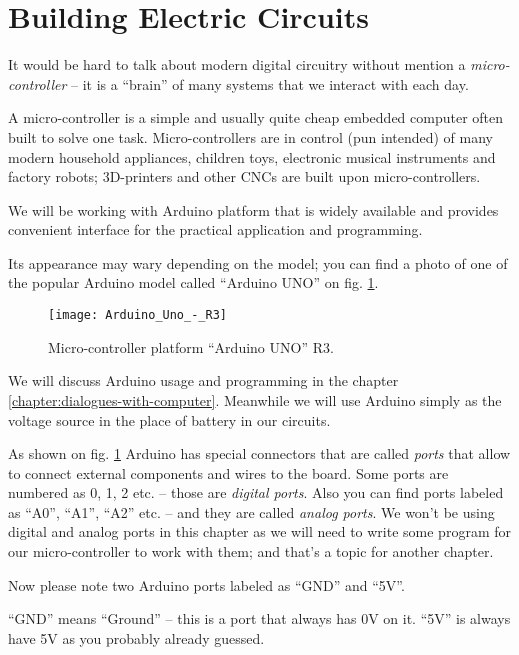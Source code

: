 \documentclass[../sparc.tex]{subfiles}
\begin{document}
\section{Building Electric Circuits}

It would be hard to talk about modern digital circuitry without mention a
\emph{micro-controller} -- it is a ``brain'' of many systems that we interact
with each day.

A micro-controller is a simple and usually quite cheap embedded computer often
built to solve one task.  Micro-controllers are in control (pun intended) of
many modern household appliances, children toys, electronic musical instruments
and factory robots; 3D-printers and other CNCs are built upon micro-controllers.

We will be working with Arduino platform that is widely available and provides
convenient interface for the practical application and programming.

Its appearance may wary depending on the model; you can find a photo of one of
the popular Arduino model called ``Arduino UNO'' on
fig. \ref{fig:arduino-uno-r3}.

\begin{figure}[ht]
  \centering
  \texttt{[image: Arduino\_Uno\_-\_R3]}
  \caption{Micro-controller platform ``Arduino UNO'' R3.}
  \label{fig:arduino-uno-r3}
\end{figure}

We will discuss Arduino usage and programming in the chapter
\ref{chapter:dialogues-with-computer}.  Meanwhile we will use Arduino simply as
the voltage source in the place of battery in our circuits.

As shown on fig. \ref{fig:arduino-uno-r3} Arduino has special connectors that
are called \emph{ports} that allow to connect external components and wires to
the board.  Some ports are numbered as 0, 1, 2 etc. -- those are \emph{digital
ports}.  Also you can find ports labeled as ``A0'', ``A1'', ``A2'' etc. -- and
they are called \emph{analog ports}.  We won't be using digital and analog ports
in this chapter as we will need to write some program for our micro-controller
to work with them; and that's a topic for another chapter.

Now please note two Arduino ports labeled as ``GND'' and ``5V''.

``GND'' means ``Ground'' -- this is a port that always has 0V on it.  ``5V'' is
always have 5V as you probably already guessed.
\end{document}
